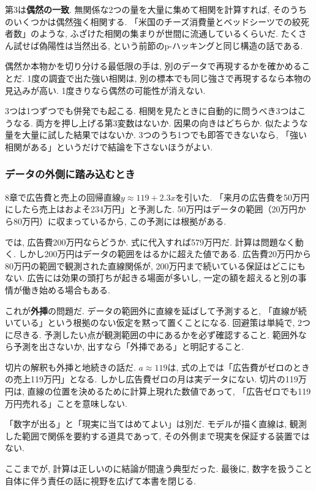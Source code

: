 第3は\textbf{偶然の一致}.
無関係な2つの量を大量に集めて相関を計算すれば, そのうちのいくつかは偶然強く相関する.
「米国のチーズ消費量とベッドシーツでの絞死者数」のような, ふざけた相関の集まりが世間に流通しているくらいだ.
たくさん試せば偽陽性は当然出る, という前節のp-ハッキングと同じ構造の話である.

偶然か本物かを切り分ける最低限の手は, 別のデータで再現するかを確かめることだ.
1度の調査で出た強い相関は, 別の標本でも同じ強さで再現するなら本物の見込みが高い. 1度きりなら偶然の可能性が消えない.

3つは1つずつでも併発でも起こる. 相関を見たときに自動的に問うべき3つはこうなる.
両方を押し上げる第3変数はないか. 因果の向きはどちらか. 似たような量を大量に試した結果ではないか.
3つのうち1つでも即答できないなら, 「強い相関がある」というだけで結論を下さないほうがよい.

\subsubsection*{データの外側に踏み込むとき}

8章で広告費と売上の回帰直線$y \approx 119 + 2.3x$を引いた.
「来月の広告費を50万円にしたら売上はおよそ234万円」と予測した.
50万円はデータの範囲（20万円から80万円）に収まっているから, この予測には根拠がある.

では, 広告費200万円ならどうか.
式に代入すれば579万円だ. 計算は問題なく動く.
しかし200万円はデータの範囲をはるかに超えた値である.
広告費20万円から80万円の範囲で観測された直線関係が, 200万円まで続いている保証はどこにもない.
広告には効果の頭打ちが起きる場面が多いし, 一定の額を超えると別の事情が働き始める場合もある.

これが\textbf{外挿}の問題だ.
データの範囲外に直線を延ばして予測すると, 「直線が続いている」という根拠のない仮定を黙って置くことになる.
回避策は単純で, 2つに尽きる. 予測したい点が観測範囲の中にあるかを必ず確認すること. 範囲外なら予測を出さないか, 出すなら「外挿である」と明記すること.

切片の解釈も外挿と地続きの話だ.
$a \approx 119$は, 式の上では「広告費がゼロのときの売上119万円」となる.
しかし広告費ゼロの月は実データにない.
切片の119万円は, 直線の位置を決めるために計算上現れた数値であって, 「広告ゼロでも119万円売れる」ことを意味しない.

「数字が出る」と「現実に当てはめてよい」は別だ.
モデルが描く直線は, 観測した範囲で関係を要約する道具であって, その外側まで現実を保証する装置ではない.

ここまでが, 計算は正しいのに結論が間違う典型だった.
最後に, 数字を扱うこと自体に伴う責任の話に視野を広げて本書を閉じる.



